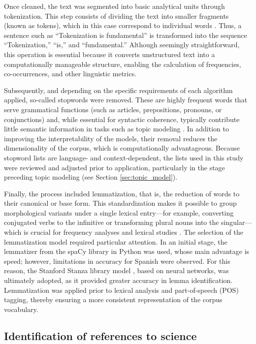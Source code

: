 \documentclass[11pt,a4paper]{article}
\begin{document}
		Once cleaned, the text was segmented into basic analytical units through tokenization. This step consists of dividing the text into smaller fragments (known as tokens), which in this case correspond to individual words \cite{Tyagi_text}. Thus, a sentence such as “Tokenization is fundamental” is transformed into the sequence “Tokenization,” “is,” and “fundamental.” Although seemingly straightforward, this operation is essential because it converts unstructured text into a computationally manageable structure, enabling the calculation of frequencies, co-occurrences, and other linguistic metrics.
		

		Subsequently, and depending on the specific requirements of each algorithm applied, so-called stopwords were removed. These are highly frequent words that serve grammatical functions (such as articles, prepositions, pronouns, or conjunctions) and, while essential for syntactic coherence, typically contribute little semantic information in tasks such as topic modeling \cite{Siino2024}. In addition to improving the interpretability of the models, their removal reduces the dimensionality of the corpus, which is computationally advantageous. Because stopword lists are language- and context-dependent, the lists used in this study were reviewed and adjusted prior to application, particularly in the stage preceding topic modeling (see Section \ref{sec:topic_model}).
		
	
		Finally, the process included lemmatization, that is, the reduction of words to their canonical or base form. This standardization makes it possible to group morphological variants under a single lexical entry—for example, converting conjugated verbs to the infinitive or transforming plural nouns into the singular—which is crucial for frequency analyses and lexical studies \cite{Orellana2018}. The selection of the lemmatization model required particular attention. In an initial stage, the lemmatizer from the spaCy library in Python was used, whose main advantage is speed; however, limitations in accuracy for Spanish were observed. For this reason, the Stanford Stanza library model \cite{qi2020stanza}, based on neural networks, was ultimately adopted, as it provided greater accuracy in lemma identification. Lemmatization was applied prior to lexical analysis and part-of-speech (POS) tagging, thereby ensuring a more consistent representation of the corpus vocabulary.

	
	\subsection{Identification of references to science}
	
\end{document}
